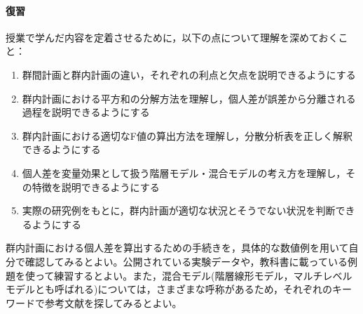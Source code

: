 \paragraph{復習}
授業で学んだ内容を定着させるために，以下の点について理解を深めておくこと：

\begin{enumerate}
\item 群間計画と群内計画の違い，それぞれの利点と欠点を説明できるようにする
\item 群内計画における平方和の分解方法を理解し，個人差が誤差から分離される過程を説明できるようにする
\item 群内計画における適切なF値の算出方法を理解し，分散分析表を正しく解釈できるようにする
\item 個人差を変量効果として扱う階層モデル・混合モデルの考え方を理解し，その特徴を説明できるようにする
\item 実際の研究例をもとに，群内計画が適切な状況とそうでない状況を判断できるようにする
\end{enumerate}

群内計画における個人差を算出するための手続きを，具体的な数値例を用いて自分で確認してみるとよい。公開されている実験データや，教科書に載っている例題を使って練習するとよい。また，混合モデル(階層線形モデル，マルチレベルモデルとも呼ばれる)については，さまざまな呼称があるため，それぞれのキーワードで参考文献を探してみるとよい。